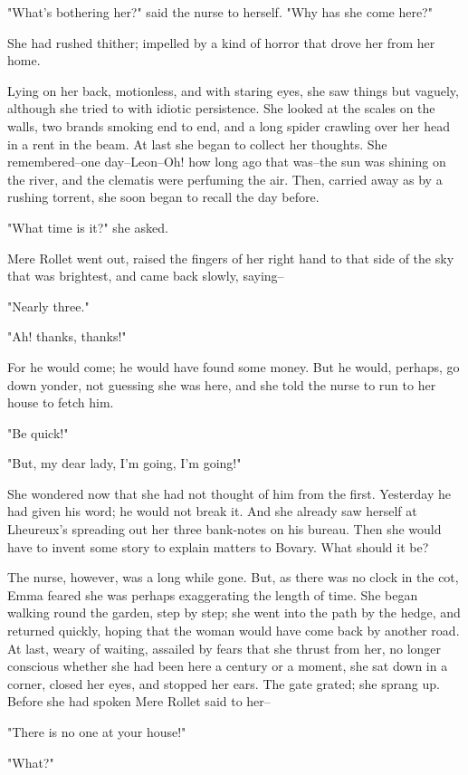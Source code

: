 \documentclass{tufte-book}
\begin{document}
"What's bothering her?" said the nurse to herself. "Why has she come
here?"

She had rushed thither; impelled by a kind of horror that drove her from
her home.

Lying on her back, motionless, and with staring eyes, she saw things but
vaguely, although she tried to with idiotic persistence. She looked
at the scales on the walls, two brands smoking end to end, and a long
spider crawling over her head in a rent in the beam. At last she began
to collect her thoughts. She remembered--one day--Leon--Oh! how long
ago that was--the sun was shining on the river, and the clematis were
perfuming the air. Then, carried away as by a rushing torrent, she soon
began to recall the day before.

"What time is it?" she asked.

Mere Rollet went out, raised the fingers of her right hand to that side
of the sky that was brightest, and came back slowly, saying--

"Nearly three."

"Ah! thanks, thanks!"

For he would come; he would have found some money. But he would,
perhaps, go down yonder, not guessing she was here, and she told the
nurse to run to her house to fetch him.

"Be quick!"

"But, my dear lady, I'm going, I'm going!"

She wondered now that she had not thought of him from the first.
Yesterday he had given his word; he would not break it. And she already
saw herself at Lheureux's spreading out her three bank-notes on his
bureau. Then she would have to invent some story to explain matters to
Bovary. What should it be?

The nurse, however, was a long while gone. But, as there was no clock
in the cot, Emma feared she was perhaps exaggerating the length of time.
She began walking round the garden, step by step; she went into the path
by the hedge, and returned quickly, hoping that the woman would have
come back by another road. At last, weary of waiting, assailed by fears
that she thrust from her, no longer conscious whether she had been here
a century or a moment, she sat down in a corner, closed her eyes, and
stopped her ears. The gate grated; she sprang up. Before she had spoken
Mere Rollet said to her--

"There is no one at your house!"

"What?"
\end{document}
